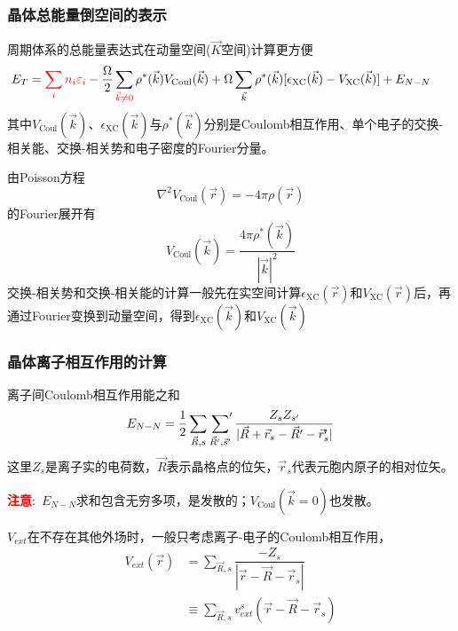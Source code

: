 \documentclass[cjk,slidestop,handout,compress,mathserif,blue]{beamer}	%
\begin{document}
\frame
{
	\frametitle{晶体总能量倒空间的表示}
周期体系的总能量表达式在动量空间($\vec K$空间)计算更方便
\begin{displaymath}
	\hspace*{-15.0pt}	E_T=\textcolor{red}{\sum_in_i\varepsilon_i}-\dfrac{\Omega}2\sum_{\textcolor{red}{\vec k\neq 0}}\rho^{\ast}(\vec k)V_{\mathrm{Coul}}(\vec k)+\Omega\sum_{\vec k}\rho^{\ast}(\vec k)[\epsilon_{\mathrm{XC}}(\vec k)-V_{\mathrm{XC}}(\vec k)]+E_{N-N}
\end{displaymath}
其中$V_{\mathrm{Coul}}(\vec k)$、$\epsilon_{\mathrm{XC}}(\vec k)$与$\rho^{\ast}(\vec k)$分别是\textrm{Coulomb}相互作用、单个电子的交换-相关能、交换-相关势和电子密度的\textrm{Fourier}分量。

由\textrm{Poisson}方程
\begin{displaymath}
	\nabla^2V_{\mathrm{Coul}}(\vec r)=-4\pi\rho(\vec r)
\end{displaymath}
的\textrm{Fourier}展开有
\begin{displaymath}
	V_{\mathrm{Coul}}(\vec k)=\dfrac{4\pi\rho^{\ast}(\vec k)}{|\vec k|^2}
\end{displaymath}
交换-相关势和交换-相关能的计算一般先在实空间计算$\epsilon_{\mathrm{XC}}(\vec r)$和$V_{\mathrm{XC}}(\vec r)$后，再通过\textrm{Fourier}变换到动量空间，得到$\epsilon_{\mathrm{XC}}(\vec k)$和$V_{\mathrm{XC}}(\vec k)$
}

\frame
{
	\frametitle{晶体离子相互作用的计算}
	离子间\textrm{Coulomb}相互作用能之和
	\begin{displaymath}
		E_{N-N}=\dfrac12\sum_{\vec R,s}\sideset{}{^{\prime}}\sum_{\vec R^{\prime},\vec s^{\prime}}\dfrac{Z_sZ_{s^{\prime}}}{|\vec R+\vec r_s-\vec R^{\prime}-\vec r_s^{\prime}|}
	\end{displaymath}
	这里$Z_s$是离子实的电荷数，$\vec R$表示晶格点的位矢，$\vec r_s$代表元胞内原子的相对位矢。

	\textcolor{red}{\textbf{注意}}:~$E_{N-N}$求和包含无穷多项，是发散的；$V_{\mathrm{Coul}}(\vec k=0)$也发散。
	
	$V_{ext}$在不存在其他外场时，一般只考虑离子-电子的\textrm{Coulomb}相互作用，
	\begin{displaymath}
		\begin{aligned}
			V_{ext}(\vec r)&=\sum_{\vec R,s}\dfrac{-Z_s}{|\vec r-\vec R-\vec r_s|}\\
			&\equiv\sum_{\vec R,s}v_{ext}^s(\vec r-\vec R-\vec r_s)
		\end{aligned}
	\end{displaymath}
}
\end{document}
